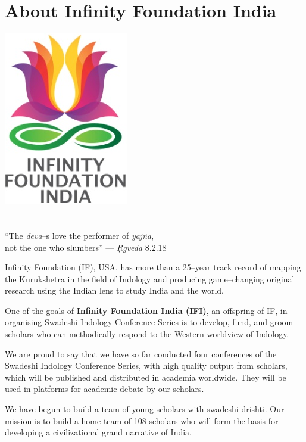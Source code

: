 
\chapter*{About Infinity Foundation India}\label{about}

\begin{center}
 \includegraphics[scale=0.23]{images/logo.png}\\\\\\
 “The \textit{deva}–s love the performer of \textit{yajña},\\ 
 not the one who slumbers” — \textit{Ṛgveda} 8.2.18
\end{center}

Infinity Foundation (IF), USA, has more than a 25–year track record of mapping the Kurukshetra in the field of Indology and producing game–changing original research using the Indian lens to study India and the world.

One of the goals of \textbf{Infinity Foundation India (IFI)}, an offspring of IF, in organising Swadeshi Indology Conference Series is to develop, fund, and groom scholars who can methodically respond to the Western worldview of Indology.

We are proud to say that we have so far conducted four conferences of the Swadeshi Indology Conference Series, with high quality output from scholars, which will be published and distributed in academia worldwide. They will be used in platforms for academic debate by our scholars.

We have begun to build a team of young scholars with swadeshi drishti. Our mission is to build a home team of 108 scholars who will form the basis for developing a civilizational grand narrative of India.

